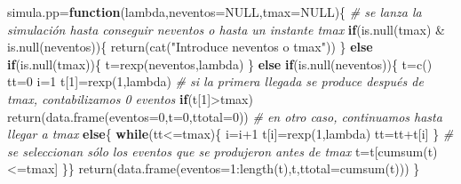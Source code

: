 \documentclass[
]{book}
\newenvironment{Shaded}{\begin{snugshade}}{\end{snugshade}}
\newcommand{\AttributeTok}[1]{\textcolor[rgb]{0.77,0.63,0.00}{#1}}
\newcommand{\CommentTok}[1]{\textcolor[rgb]{0.56,0.35,0.01}{\textit{#1}}}
\newcommand{\ConstantTok}[1]{\textcolor[rgb]{0.00,0.00,0.00}{#1}}
\newcommand{\ControlFlowTok}[1]{\textcolor[rgb]{0.13,0.29,0.53}{\textbf{#1}}}
\newcommand{\DecValTok}[1]{\textcolor[rgb]{0.00,0.00,0.81}{#1}}
\newcommand{\FunctionTok}[1]{\textcolor[rgb]{0.00,0.00,0.00}{#1}}
\newcommand{\NormalTok}[1]{#1}
\newcommand{\OtherTok}[1]{\textcolor[rgb]{0.56,0.35,0.01}{#1}}
\newcommand{\SpecialCharTok}[1]{\textcolor[rgb]{0.00,0.00,0.00}{#1}}
\newcommand{\StringTok}[1]{\textcolor[rgb]{0.31,0.60,0.02}{#1}}
\theoremstyle{definition}
\theoremstyle{definition}
\theoremstyle{definition}
\theoremstyle{definition}
\theoremstyle{remark}
\begin{document}
\begin{Shaded}
\begin{Highlighting}[]
\NormalTok{simula.pp}\OtherTok{=}\ControlFlowTok{function}\NormalTok{(lambda,}\AttributeTok{neventos=}\ConstantTok{NULL}\NormalTok{,}\AttributeTok{tmax=}\ConstantTok{NULL}\NormalTok{)\{}
  \CommentTok{\# se lanza la simulación hasta conseguir neventos o hasta un instante tmax}
  \ControlFlowTok{if}\NormalTok{(}\FunctionTok{is.null}\NormalTok{(tmax) }\SpecialCharTok{\&} \FunctionTok{is.null}\NormalTok{(neventos))\{}
    \FunctionTok{return}\NormalTok{(}\FunctionTok{cat}\NormalTok{(}\StringTok{"Introduce neventos o tmax"}\NormalTok{))}
\NormalTok{  \}}
  \ControlFlowTok{else} \ControlFlowTok{if}\NormalTok{(}\FunctionTok{is.null}\NormalTok{(tmax))\{}
\NormalTok{    t}\OtherTok{=}\FunctionTok{rexp}\NormalTok{(neventos,lambda)}
\NormalTok{  \}}
  \ControlFlowTok{else} \ControlFlowTok{if}\NormalTok{(}\FunctionTok{is.null}\NormalTok{(neventos))\{}
\NormalTok{    t}\OtherTok{=}\FunctionTok{c}\NormalTok{()}
\NormalTok{    tt}\OtherTok{=}\DecValTok{0}
\NormalTok{    i}\OtherTok{=}\DecValTok{1}
\NormalTok{    t[}\DecValTok{1}\NormalTok{]}\OtherTok{=}\FunctionTok{rexp}\NormalTok{(}\DecValTok{1}\NormalTok{,lambda)}
    \CommentTok{\# si la primera llegada se produce después de tmax, contabilizamos 0 eventos}
    \ControlFlowTok{if}\NormalTok{(t[}\DecValTok{1}\NormalTok{]}\SpecialCharTok{\textgreater{}}\NormalTok{tmax)}
      \FunctionTok{return}\NormalTok{(}\FunctionTok{data.frame}\NormalTok{(}\AttributeTok{eventos=}\DecValTok{0}\NormalTok{,}\AttributeTok{t=}\DecValTok{0}\NormalTok{,}\AttributeTok{ttotal=}\DecValTok{0}\NormalTok{))}
    \CommentTok{\# en otro caso, continuamos hasta llegar a tmax}
    \ControlFlowTok{else}\NormalTok{\{}
    \ControlFlowTok{while}\NormalTok{(tt}\SpecialCharTok{\textless{}=}\NormalTok{tmax)\{}
\NormalTok{      i}\OtherTok{=}\NormalTok{i}\SpecialCharTok{+}\DecValTok{1}
\NormalTok{      t[i]}\OtherTok{=}\FunctionTok{rexp}\NormalTok{(}\DecValTok{1}\NormalTok{,lambda)}
\NormalTok{      tt}\OtherTok{=}\NormalTok{tt}\SpecialCharTok{+}\NormalTok{t[i]}
\NormalTok{        \}}
    \CommentTok{\# se seleccionan sólo los eventos que se produjeron antes de tmax}
\NormalTok{    t}\OtherTok{=}\NormalTok{t[}\FunctionTok{cumsum}\NormalTok{(t)}\SpecialCharTok{\textless{}=}\NormalTok{tmax]}
\NormalTok{  \}\}}
\FunctionTok{return}\NormalTok{(}\FunctionTok{data.frame}\NormalTok{(}\AttributeTok{eventos=}\DecValTok{1}\SpecialCharTok{:}\FunctionTok{length}\NormalTok{(t),t,}\AttributeTok{ttotal=}\FunctionTok{cumsum}\NormalTok{(t)))}
\NormalTok{\}}
\end{Highlighting}
\end{Shaded}
\end{document}
